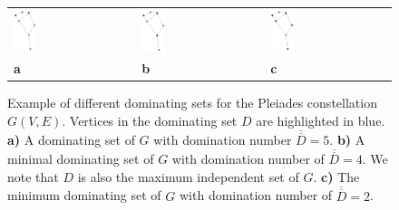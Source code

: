 \documentclass[fleqn,10pt]{wlscirep}
\begin{document}
\begin{figure}
	\centering
	\begin{tabular}{p{}p{}p{}}
	\includegraphics[width=0.20\textwidth]{./figures/subaru_ds.pdf}
&
	\includegraphics[width=0.20\textwidth]{./figures/subaru_mds4.pdf}
&
	\includegraphics[width=0.20\textwidth]{./figures/subaru_mds2.pdf}\\
	\centering\bf{a} & \centering\bf{b} & \centering\bf{c}
	\end{tabular}
	\caption{Example of different dominating sets for the Pleiades constellation $G(V, E)$. Vertices in the dominating set $D$ are highlighted in blue. {\bf{a)}} A dominating set of $G$ with domination number $\overline{\overline{D}} = 5$. {\bf{b)}} A minimal dominating set of $G$ with domination number of $\overline{\overline{D}} = 4$. We note that $D$ is also the maximum independent set of $G$. {\bf{c)}} The minimum dominating set of $G$ with domination number of $\overline{\overline{D}} = 2$.}
	\label{fig:dominating_sets}
\end{figure}
\end{document}
